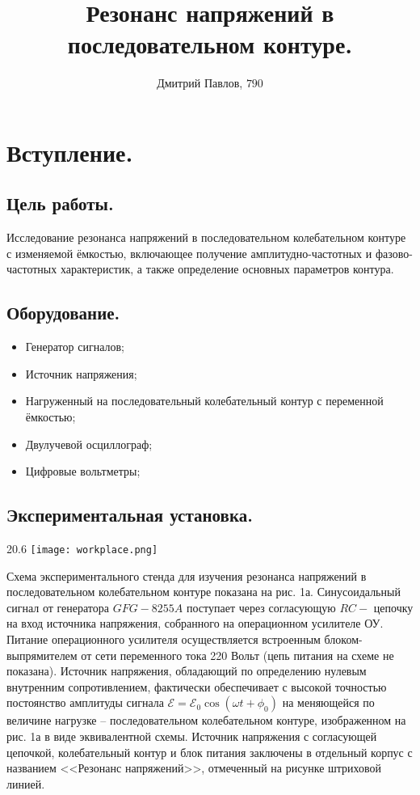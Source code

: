 \documentclass[12pt,a4paper]{article}
\author{Дмитрий Павлов, $790$}
\title {\textbf{Резонанс напряжений в последовательном контуре.}}
\begin{document}
\maketitle
\newpage
\tableofcontents 

\newpage

\section{Вступление.}
    \subsection{Цель работы.}
         Исследование резонанса напряжений в последовательном колебательном контуре с изменяемой ёмкостью, включающее получение амплитудно-частотных и фазово-частотных характеристик, а также определение основных параметров контура.
        
    \subsection{Оборудование.}
        \begin{itemize}
            \item Генератор сигналов;
            \item Источник напряжения;
            \item Нагруженный на последовательный колебательный контур с переменной ёмкостью;
            \item Двулучевой осциллограф;
            \item Цифровые вольтметры;
        \end{itemize}

    \subsection{Экспериментальная установка.}
         \begin{wrapfigure}{2}{0.6\linewidth}
        	\texttt{[image: workplace.png]}
        	\hspace{44pt}{Рисунок 1 -- Схема экспериментального стенда.}
        \end{wrapfigure}
        
        Схема экспериментального стенда для изучения резонанса напряжений в последовательном колебательном контуре показана на рис. 1а. Синусоидальный сигнал от генератора $GFG-8255A$ поступает через согласующую $RC-$ цепочку на вход источника напряжения, собранного на операционном усилителе ОУ. Питание операционного усилителя осуществляется встроенным блоком-выпрямителем от сети переменного тока 220 Вольт (цепь питания на схеме не показана). Источник напряжения, обладающий по определению нулевым внутренним сопротивлением, фактически обеспечивает с высокой точностью постоянство амплитуды сигнала $\mathscr{E} = \mathscr{E}_0\cos{(\omega t + \phi_0)}$ на меняющейся по величине нагрузке – последовательном колебательном контуре, изображенном на рис. 1а в виде эквивалентной схемы. Источник напряжения с согласующей цепочкой, колебательный контур и блок питания заключены в отдельный корпус с названием <<Резонанс напряжений>>, отмеченный на рисунке штриховой линией.
        
\end{document}
